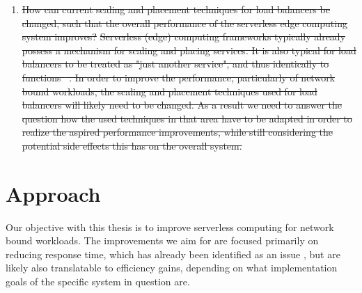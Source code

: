 \documentclass[draft,final]{vutinfth} %
\providecommand{\DIFaddtex}[1]{{\protect\color{blue}\uwave{#1}}} %
\providecommand{\DIFdeltex}[1]{{\protect\color{red}\sout{#1}}}                      %
\providecommand{\DIFaddbegin}{} %
\providecommand{\DIFaddend}{} %
\providecommand{\DIFdelend}{} %
\providecommand{\DIFadd}[1]{\texorpdfstring{\DIFaddtex{#1}}{#1}} %
\providecommand{\DIFdel}[1]{\texorpdfstring{\DIFdeltex{#1}}{}} %
\begin{document}
\begin{enumerate}
\item%
\DIFdel{How can current scaling and placement techniques for load balancers be changed, such that the overall performance of the serverless edge computing system improves?}%
\DIFdel{Serverless (edge) computing frameworks typically already possess a mechanism for scaling and placing services. It is also typical for load balancers to be treated as "just another service", and thus identically to functions\mbox{%
\cite{openfaas}}\hskip0pt%
. 
    In order to improve the performance, particularly of network bound workloads, the scaling and placement techniques used for load balancers will likely need to be changed. As a result we need to answer the question how the used techniques in that area have to be adapted in order to realize the aspired performance improvements, while still considering the potential side effects this has on the overall system.
    }%

\DIFdelend \end{enumerate}
\section{Approach}
Our objective with this thesis is to improve serverless computing for network bound workloads. 
The improvements we aim for are focused primarily on reducing response time, which has already been identified as an issue %
\DIFaddbegin \DIFadd{\mbox{%
\cite{skippy}}\hskip0pt%
}\DIFaddend , but are likely also translatable to efficiency gains, depending on what \DIFaddbegin \DIFadd{the }\DIFaddend implementation goals of the specific system in question are.
\end{document}
